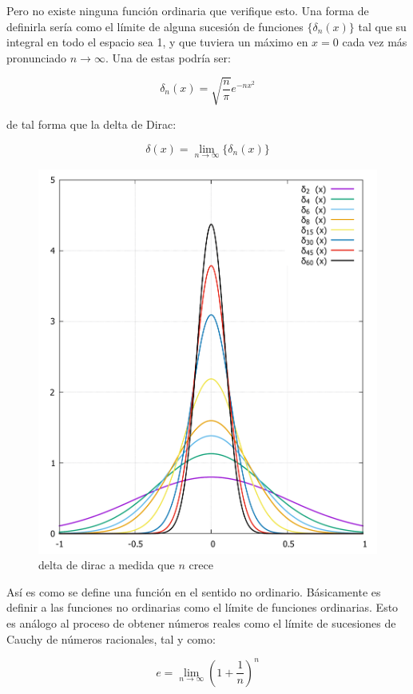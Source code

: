 \documentclass[12pt,a4paper]{book}
\newcommand{\parentesis}[1]{\left( #1  \right)}
\begin{document}
Pero no existe ninguna función ordinaria que verifique esto. Una forma de definirla sería como el límite de alguna  sucesión de funciones $\{ \delta_n (x) \}$ tal que su integral en todo el espacio sea 1, y que tuviera un máximo en $x=0$ cada vez más pronunciado $n \rightarrow \infty$. Una de estas podría ser:

$$  \delta_n (x) = \sqrt{\dfrac{n}{\pi}} e^{-nx^2} $$

de tal forma que la delta de Dirac:

$$ \delta (x) = \lim_{n \rightarrow \infty} \{  \delta_n (x)  \}  $$

\begin{figure}[h!] \centering
\includegraphics[scale=0.5]{deltadirac.pdf}
\caption{delta de dirac a medida que $n$ crece}
\end{figure}

Así es como se define una función en el sentido no ordinario. Básicamente es definir a las funciones no ordinarias como el límite de funciones ordinarias. Esto es análogo al proceso de obtener números reales como el límite de sucesiones de Cauchy de números racionales, tal y como:

$$ e = \lim_{n \rightarrow \infty} \parentesis{1+\dfrac{1}{n}}^n $$
\end{document}
